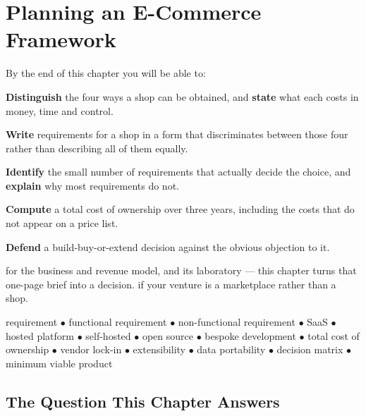 \chapter{Planning an E-Commerce Framework}\label{ch:planning}

\begin{outcomes}
By the end of this chapter you will be able to:
\begin{tight}
  \item \textbf{Distinguish} the four ways a shop can be obtained, and
        \textbf{state} what each costs in money, time and control.
  \item \textbf{Write} requirements for a shop in a form that discriminates
        between those four rather than describing all of them equally.
  \item \textbf{Identify} the small number of requirements that actually decide
        the choice, and \textbf{explain} why most requirements do not.
  \item \textbf{Compute} a total cost of ownership over three years, including
        the costs that do not appear on a price list.
  \item \textbf{Defend} a build-buy-or-extend decision against the obvious
        objection to it.
\end{tight}
\end{outcomes}

\begin{prereq}
 for the business and revenue model, and its laboratory --- this
chapter turns that one-page brief into a decision.  if your
venture is a marketplace rather than a shop.
\end{prereq}

\begin{keyterms}
requirement $\bullet$ functional requirement $\bullet$ non-functional
requirement $\bullet$ SaaS $\bullet$ hosted platform $\bullet$ self-hosted
$\bullet$ open source $\bullet$ bespoke development $\bullet$ total cost of
ownership $\bullet$ vendor lock-in $\bullet$ extensibility $\bullet$ data
portability $\bullet$ decision matrix $\bullet$ minimum viable product
\end{keyterms}

\section{The Question This Chapter Answers}

